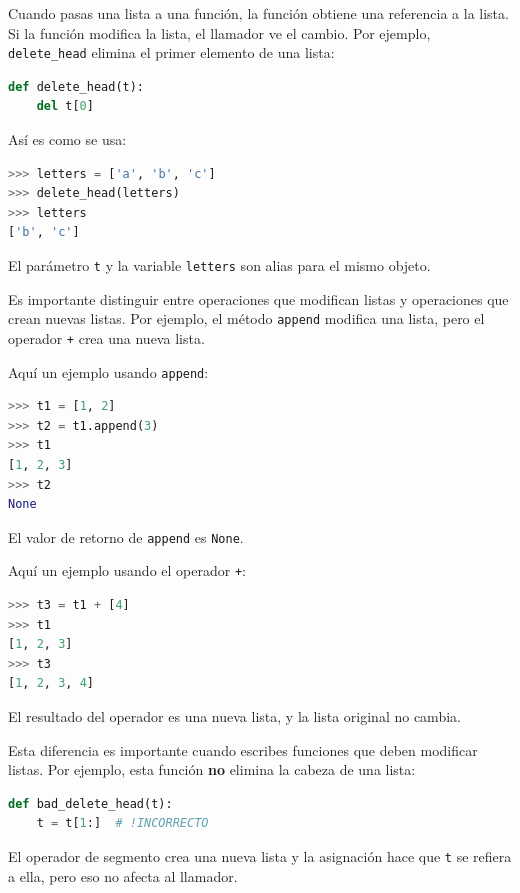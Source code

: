 Cuando pasas una lista a una función, la función obtiene una referencia a la lista. Si la función modifica la lista, el llamador ve el cambio. Por ejemplo, \texttt{delete\_head} elimina el primer elemento de una lista:

\begin{lstlisting}[language=Python]
def delete_head(t):
    del t[0]
\end{lstlisting}

Así es como se usa:

\begin{lstlisting}[language=Python]
>>> letters = ['a', 'b', 'c'] 
>>> delete_head(letters) 
>>> letters 
['b', 'c']
\end{lstlisting}

El parámetro \texttt{t} y la variable \texttt{letters} son alias para el mismo objeto.

Es importante distinguir entre operaciones que modifican listas y operaciones que crean nuevas listas. Por ejemplo, el método \texttt{append} modifica una lista, pero el operador \texttt{+} crea una nueva lista.

Aquí un ejemplo usando \texttt{append}:

\begin{lstlisting}[language=Python]
>>> t1 = [1, 2] 
>>> t2 = t1.append(3) 
>>> t1 
[1, 2, 3] 
>>> t2 
None
\end{lstlisting}

El valor de retorno de \texttt{append} es \texttt{None}.

Aquí un ejemplo usando el operador \texttt{+}:

\begin{lstlisting}[language=Python]
>>> t3 = t1 + [4] 
>>> t1 
[1, 2, 3] 
>>> t3 
[1, 2, 3, 4]
\end{lstlisting}

El resultado del operador es una nueva lista, y la lista original no cambia.

Esta diferencia es importante cuando escribes funciones que deben modificar listas. Por ejemplo, esta función \textbf{no} elimina la cabeza de una lista:

\begin{lstlisting}[language=Python]
def bad_delete_head(t):
    t = t[1:]  # !INCORRECTO
\end{lstlisting}


El operador de segmento crea una nueva lista y la asignación hace que \texttt{t} se refiera a ella, pero eso no afecta al llamador.

